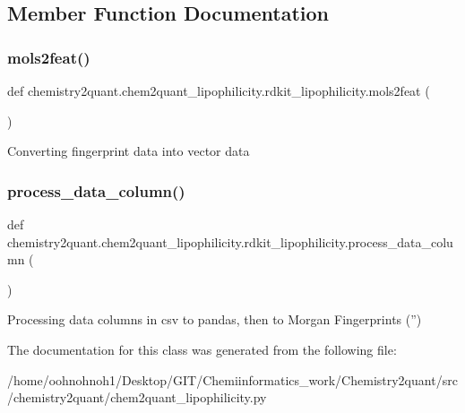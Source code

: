 \subsection{Member Function Documentation}
\mbox{\label{classchemistry2quant_1_1chem2quant__lipophilicity_1_1rdkit__lipophilicity_a0529318f2021adfc7004f786ac98848d}} 
\subsubsection{\texorpdfstring{mols2feat()}{mols2feat()}}
{\footnotesize\ttfamily def chemistry2quant.\+chem2quant\+\_\+lipophilicity.\+rdkit\+\_\+lipophilicity.\+mols2feat (\begin{DoxyParamCaption}{ }\end{DoxyParamCaption})}

\begin{DoxyVerb}Converting fingerprint data into vector data 
\end{DoxyVerb}
 \mbox{\label{classchemistry2quant_1_1chem2quant__lipophilicity_1_1rdkit__lipophilicity_a46c111c55d4619ab2865950b46d6c361}} 
\subsubsection{\texorpdfstring{process\+\_\+data\+\_\+column()}{process\_data\_column()}}
{\footnotesize\ttfamily def chemistry2quant.\+chem2quant\+\_\+lipophilicity.\+rdkit\+\_\+lipophilicity.\+process\+\_\+data\+\_\+column (\begin{DoxyParamCaption}{ }\end{DoxyParamCaption})}

\begin{DoxyVerb}Processing data columns in csv to pandas, then to Morgan Fingerprints ('') 
\end{DoxyVerb}
 

The documentation for this class was generated from the following file\+:\begin{DoxyCompactItemize}
\item 
/home/oohnohnoh1/\+Desktop/\+G\+I\+T/\+Chemiinformatics\+\_\+work/\+Chemistry2quant/src/chemistry2quant/chem2quant\+\_\+lipophilicity.\+py\end{DoxyCompactItemize}
